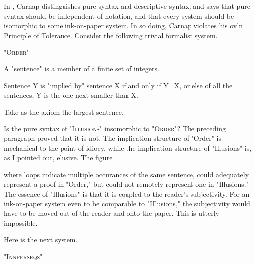 In , Carnap distinguishes pure syntax 
and descriptive syntax; and says that pure syntax should be independent of 
notation, and that every system should be isomorphic to some ink-on-paper 
system. In so doing, Carnap violates his ov'n Principle of Tolerance. Consider 
the following trivial formalist system. 

{ \centering \large "\textsc{Order}" \par}

\begin{sysrules}
A "sentence" is a member of a finite set of integers. 

Sentence Y is "implied by" sentence X if and only if Y=X, or else of all the 
sentences, Y is the one next smaller than X. 

Take as the axiom the largest sentence. 
\end{sysrules}

Is the pure syntax of "\textsc{Illusions}" insomorphic to "\textsc{Order}"? The preceding 
paragraph proved that it is not. The implication structure of "Order" is 
mechanical to the point of idiocy, while the implication structure of 
"Illusions" is, as I pointed out, elusive. The figure 


where loops indicate multiple occurances of the same sentence, could 
adequately represent a proof in "Order," but could not remotely represent 
one in "Illusions." The essence of "Illusions" is that it is coupled to the 
reader's subjectivity. For an ink-on-paper system even to be comparable to 
"IIlusions," the subjectivity would have to be moved out of the reader and 
onto the paper. This is utterly impossible. 

Here is the next system. 

{ \centering \large "\textsc{Innperseqs}" \par}

